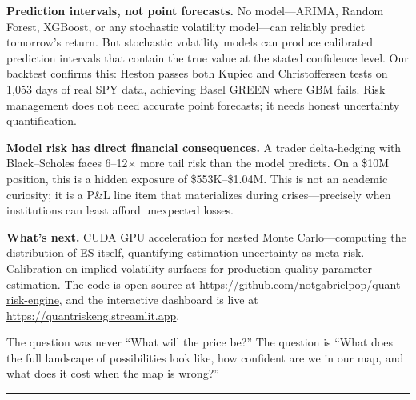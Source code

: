 \documentclass[11pt,a4paper]{article}
\begin{document}
\textbf{Prediction intervals, not point forecasts.} No model---ARIMA, Random Forest, XGBoost, or any stochastic volatility model---can reliably predict tomorrow's return. But stochastic volatility models can produce calibrated prediction intervals that contain the true value at the stated confidence level. Our backtest confirms this: Heston passes both Kupiec and Christoffersen tests on 1{,}053 days of real SPY data, achieving Basel GREEN where GBM fails. Risk management does not need accurate point forecasts; it needs honest uncertainty quantification.

\textbf{Model risk has direct financial consequences.} A trader delta-hedging with Black--Scholes faces 6--12$\times$ more tail risk than the model predicts. On a \$10M position, this is a hidden exposure of \$553K--\$1.04M. This is not an academic curiosity; it is a P\&L line item that materializes during crises---precisely when institutions can least afford unexpected losses.

\textbf{What's next.} CUDA GPU acceleration for nested Monte Carlo---computing the distribution of ES itself, quantifying estimation uncertainty as meta-risk. Calibration on implied volatility surfaces for production-quality parameter estimation. The code is open-source at \url{https://github.com/notgabrielpop/quant-risk-engine}, and the interactive dashboard is live at \url{https://quantriskeng.streamlit.app}.

The question was never ``What will the price be?'' The question is ``What does the full landscape of possibilities look like, how confident are we in our map, and what does it cost when the map is wrong?''

\vspace{1em}
\hrule
\vspace{0.5em}
\end{document}

